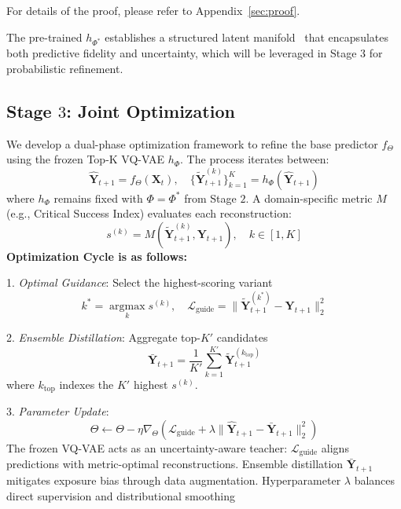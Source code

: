 For details of the proof, please refer to Appendix~\ref{sec:proof}.

The pre-trained $h_{\Phi^*}$ establishes a structured latent manifold~\cite{han2018structured} that encapsulates both predictive fidelity and uncertainty, which will be leveraged in Stage $3$ for probabilistic refinement.


\subsection{Stage $3$: Joint Optimization}  
We develop a dual-phase optimization framework to refine the base predictor $f_\Theta$ using the frozen Top-K VQ-VAE $h_\Phi$. The process iterates between:
\begin{equation}
\hat{\mathbf{Y}}_{t+1} = f_\Theta(\mathbf{X}_t), \quad \{\tilde{\mathbf{Y}}_{t+1}^{(k)}\}_{k=1}^K = h_\Phi(\hat{\mathbf{Y}}_{t+1})
\end{equation}
where $h_\Phi$ remains fixed with $\Phi = \Phi^*$ from Stage $2$. A domain-specific metric $M$ (e.g., Critical Success Index) evaluates each reconstruction:
\begin{equation}
s^{(k)} = M(\tilde{\mathbf{Y}}_{t+1}^{(k)}, \mathbf{Y}_{t+1}), \quad k \in [1,K]
\end{equation}
\textbf{Optimization Cycle is as follows:}

1. \textit{Optimal Guidance}: Select the highest-scoring variant  
\begin{equation}
k^* = \mathop{\arg\max}\limits_{k} s^{(k)}, \quad \mathcal{L}_{\text{guide}} = \|\tilde{\mathbf{Y}}_{t+1}^{(k^*)} - \mathbf{Y}_{t+1}\|_2^2
\end{equation}

2. \textit{Ensemble Distillation}: Aggregate top-$K'$ candidates  
\begin{equation}
\bar{\mathbf{Y}}_{t+1} = \frac{1}{K'}\sum_{k=1}^{K'} \tilde{\mathbf{Y}}_{t+1}^{(k_{\text{top}})}
\end{equation}
where $k_{\text{top}}$ indexes the $K'$ highest $s^{(k)}$.

3. \textit{Parameter Update}:  
\begin{equation}
\Theta \leftarrow \Theta - \eta\nabla_\Theta(\mathcal{L}_{\text{guide}} + \lambda\|\hat{\mathbf{Y}}_{t+1} - \bar{\mathbf{Y}}_{t+1}\|_2^2)
\end{equation}
The frozen VQ-VAE acts as an uncertainty-aware teacher: $\mathcal{L}_{\text{guide}}$ aligns predictions with metric-optimal reconstructions. Ensemble distillation $\bar{\mathbf{Y}}_{t+1}$ mitigates exposure bias through data augmentation. Hyperparameter $\lambda$ balances direct supervision and distributional smoothing  

